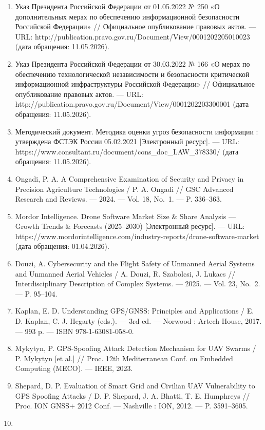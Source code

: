\documentclass[14pt,a4paper]{extarticle}
\begin{document}
\begin{enumerate}
\item
  Указ Президента Российской Федерации от 01.05.2022 № 250 «О дополнительных мерах по обеспечению информационной безопасности Российской Федерации» // Официальное опубликование правовых актов. --- URL: http://publication.pravo.gov.ru/Document/View/0001202205010023 (дата обращения: 11.05.2026).
\item
  Указ Президента Российской Федерации от 30.03.2022 № 166 «О мерах по обеспечению технологической независимости и безопасности критической информационной инфраструктуры Российской Федерации» // Официальное опубликование правовых актов. --- URL: http://publication.pravo.gov.ru/Document/View/0001202203300001 (дата обращения: 11.05.2026).
\item
  Методический документ. Методика оценки угроз безопасности информации : утверждена ФСТЭК России 05.02.2021 {[}Электронный ресурс{]}. --- URL: https://www.consultant.ru/document/cons\_doc\_LAW\_378330/ (дата обращения: 11.05.2026).
\item
  Ongadi, P. A. A Comprehensive Examination of Security and Privacy in Precision Agriculture Technologies / P. A. Ongadi // GSC Advanced Research and Reviews. --- 2024. --- Vol. 18, No.~1. --- P. 336--363.
\item
  Mordor Intelligence. Drone Software Market Size \& Share Analysis --- Growth Trends \& Forecasts (2025--2030) {[}Электронный ресурс{]}. --- URL: https://www.mordorintelligence.com/industry-reports/drone-software-market (дата обращения: 01.04.2026).
\item
  Douzi, A. Cybersecurity and the Flight Safety of Unmanned Aerial Systems and Unmanned Aerial Vehicles / A. Douzi, R. Szabolcsi, J. Lukacs // Interdisciplinary Description of Complex Systems. --- 2025. --- Vol. 23, No.~2. --- P. 95--104.
\item
  Kaplan, E. D. Understanding GPS/GNSS: Principles and Applications / E. D. Kaplan, C. J. Hegarty (eds.). --- 3rd ed. --- Norwood : Artech House, 2017. --- 993 p. --- ISBN 978-1-63081-058-0.
\item
  Mykytyn, P. GPS-Spoofing Attack Detection Mechanism for UAV Swarms / P. Mykytyn {[}et al.{]} // Proc. 12th Mediterranean Conf. on Embedded Computing (MECO). --- IEEE, 2023.
\item
  Shepard, D. P. Evaluation of Smart Grid and Civilian UAV Vulnerability to GPS Spoofing Attacks / D. P. Shepard, J. A. Bhatti, T. E. Humphreys // Proc. ION GNSS+ 2012 Conf. --- Nashville : ION, 2012. --- P. 3591--3605.
\item

\end{enumerate}
\end{document}
